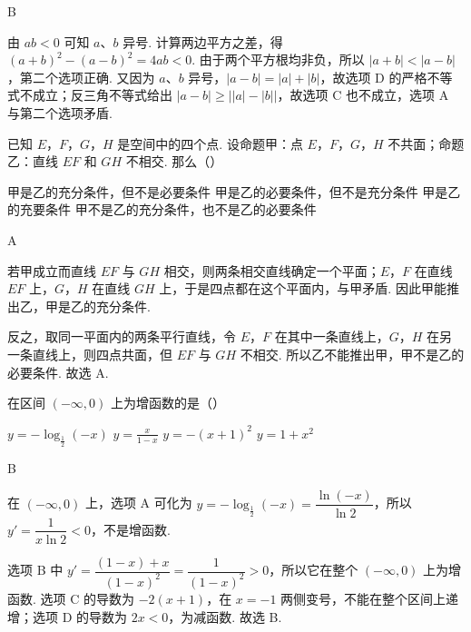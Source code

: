 \begin{answer}
B
\end{answer}

\begin{solution}
由 \(ab<0\) 可知 \(a\)、\(b\) 异号. 计算两边平方之差，得
\((a+b)^2-(a-b)^2=4ab<0\). 由于两个平方根均非负，所以 \(|a+b|<|a-b|\)，第二个选项正确. 又因为 \(a\)、\(b\) 异号，\(|a-b|=|a|+|b|\)，故选项 D 的严格不等式不成立；反三角不等式给出 \(|a-b|\geqslant\bigl||a|-|b|\bigr|\)，故选项 C 也不成立，选项 A 与第二个选项矛盾.
\end{solution}

\begin{problem}

已知 \(E\)，\(F\)，\(G\)，\(H\) 是空间中的四个点. 设命题甲：点 \(E\)，\(F\)，\(G\)，\(H\) 不共面；命题乙：直线 \(EF\) 和 \(GH\) 不相交. 那么（\quad）

\choices
    {甲是乙的充分条件，但不是必要条件}
    {甲是乙的必要条件，但不是充分条件}
    {甲是乙的充要条件}
    {甲不是乙的充分条件，也不是乙的必要条件}
\end{problem}

\begin{answer}
A
\end{answer}

\begin{solution}
若甲成立而直线 \(EF\) 与 \(GH\) 相交，则两条相交直线确定一个平面；\(E\)，\(F\) 在直线 \(EF\) 上，\(G\)，\(H\) 在直线 \(GH\) 上，于是四点都在这个平面内，与甲矛盾. 因此甲能推出乙，甲是乙的充分条件.

反之，取同一平面内的两条平行直线，令 \(E\)，\(F\) 在其中一条直线上，\(G\)，\(H\) 在另一条直线上，则四点共面，但 \(EF\) 与 \(GH\) 不相交. 所以乙不能推出甲，甲不是乙的必要条件. 故选 A.
\end{solution}

\begin{problem}

在区间 \((-\infty,0)\) 上为增函数的是（\quad）

\choices
    {\(y = -\log_{\frac{1}{2}}\left(-x\right)\)}
    {\(y = \frac{x}{1 - x}\)}
    {\(y = -(x + 1)^2\)}
    {\(y = 1 + x^2\)}
\end{problem}

\begin{answer}
B
\end{answer}

\begin{solution}
在 \((-\infty,0)\) 上，选项 A 可化为
\(y=-\log_{\frac12}\left(-x\right)=\dfrac{\ln\left(-x\right)}{\ln2}\)，所以 \(y'=\dfrac{1}{x\ln2}<0\)，不是增函数.

选项 B 中
\(y'=\dfrac{(1-x)+x}{(1-x)^2}=\dfrac{1}{(1-x)^2}>0\)，所以它在整个 \((-\infty,0)\) 上为增函数. 选项 C 的导数为 \(-2(x+1)\)，在 \(x=-1\) 两侧变号，不能在整个区间上递增；选项 D 的导数为 \(2x<0\)，为减函数. 故选 B.
\end{solution}

